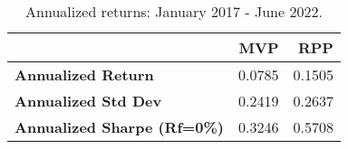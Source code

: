 \begin{table}[!htb]
    \centering
      \begingroup
      \fontsize{9}{9}
      \selectfont 
\begin{tabular}{>{}lrr}
\toprule
  & MVP & RPP\\
\midrule
\textbf{Annualized Return} & 0.0785 & 0.1505\\
\textbf{Annualized Std Dev} & 0.2419 & 0.2637\\
\textbf{Annualized Sharpe (Rf=0\%)} & 0.3246 & 0.5708\\
\bottomrule
\end{tabular} \caption{Annualized returns: January 2017 - June 2022.}
      \label{tab:RPP}  %
      \endgroup{}
      \end{table}